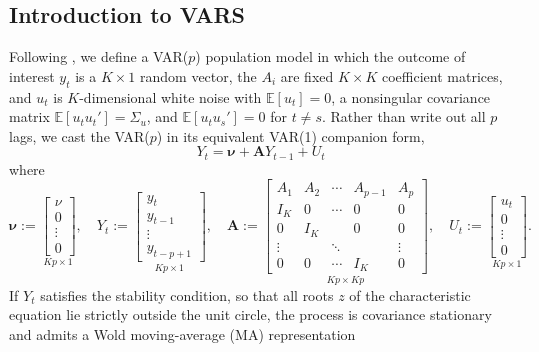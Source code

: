 \subsection{Introduction to VARS}
Following \textcite{lutkepohl2005}, we define a VAR($p$) population model in which the
outcome of interest $y_t$ is a $K \times 1$ random vector, the $A_i$ are fixed $K \times K$
coefficient matrices, and $u_t$ is $K$-dimensional white noise with $\mathbb{E}\left[ u_t\right] = 0$,
a nonsingular covariance matrix $\mathbb{E}\left[ u_t u_t' \right] = \Sigma_u$, and
$\mathbb{E}\left[ u_t u_s' \right] = 0$ for $t \neq s$. Rather than write out all $p$ lags, we
cast the VAR($p$) in its equivalent VAR(1) companion form,
%
\begin{equation}
    Y_t =\mathbf{\nu} + \mathbf{A} Y_{t-1} + U_t
\end{equation}
%
where
%
\begin{equation*}
\mathbf{\nu} := \underset{Kp\times 1}{\begin{bmatrix} \nu \\ 0 \\ \vdots \\ 0 \end{bmatrix}}, \quad
Y_t := \underset{Kp\times 1}{\begin{bmatrix} y_t \\ y_{t-1} \\ \vdots \\ y_{t-p+1} \end{bmatrix}}, \quad
\mathbf{A} := \underset{Kp\times Kp}{\begin{bmatrix}
A_1 & A_2 & \cdots & A_{p-1} & A_p \\
I_K & 0   & \cdots & 0       & 0   \\
0   & I_K &        & 0       & 0   \\
\vdots & & \ddots & & \vdots \\
0   & 0   & \cdots & I_K     & 0
\end{bmatrix}}, \quad
U_t := \underset{Kp\times 1}{\begin{bmatrix} u_t \\ 0 \\ \vdots \\ 0 \end{bmatrix}}.
\end{equation*}
%
If $Y_t$ satisfies the stability condition, so that all roots $z$ of the characteristic
equation lie strictly outside the unit circle, the process is covariance stationary and admits
a Wold moving-average (MA) representation

